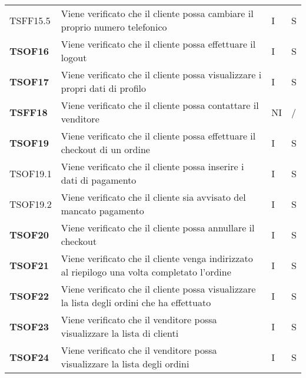 \begin{center}
\begin{longtable}[!h]{p{60px} p{240px} p{35px} p{35px}}
        TSFF15.5        & Viene verificato che il cliente possa cambiare il proprio numero telefonico                                          & I              & S              \\
        \textbf{TSOF16} & Viene verificato che il cliente possa effettuare il logout                                                           & I              & S              \\
        \textbf{TSOF17} & Viene verificato che il cliente possa visualizzare i propri dati di profilo                                          & I              & S              \\
        \textbf{TSFF18} & Viene verificato che il cliente possa contattare il venditore                                                        & NI             & /              \\
        \textbf{TSOF19} & Viene verificato che il cliente possa effettuare il checkout di un ordine                                            & I              & S              \\
        TSOF19.1        & Viene verificato che il cliente possa inserire i dati di pagamento                                                   & I              & S              \\
        TSOF19.2        & Viene verificato che il cliente sia avvisato del mancato pagamento                                                   & I              & S              \\
        \textbf{TSOF20} & Viene verificato che il cliente possa annullare il checkout                                                          & I              & S              \\
        \textbf{TSOF21} & Viene verificato che il cliente venga indirizzato al riepilogo una volta completato l'ordine                         & I              & S              \\
        \textbf{TSOF22} & Viene verificato che il cliente possa visualizzare la lista degli ordini che ha effettuato                           & I              & S              \\
        \textbf{TSOF23} & Viene verificato che il venditore possa visualizzare la lista di clienti                                             & I              & S              \\
        \textbf{TSOF24} & Viene verificato che il venditore possa visualizzare la lista degli ordini                                           & I              & S              \\

\end{longtable}
\end{center}
